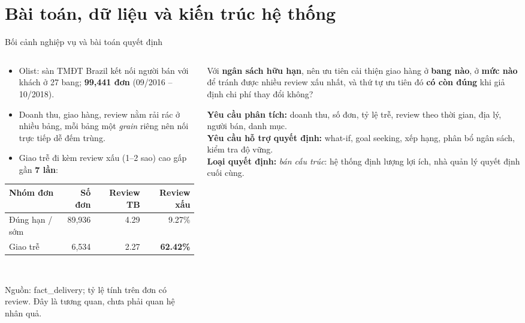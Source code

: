 \documentclass[aspectratio=169,10pt,xcolor=table]{beamer}
\newcommand{\presenter}{}
\newcommand{\setpresenter}[1]{\renewcommand{\presenter}{#1}}
\begin{document}
\setpresenter{Tạ Tiến Tài}
\section{Bài toán, dữ liệu và kiến trúc hệ thống}

\begin{frame}{Bối cảnh nghiệp vụ và bài toán quyết định}
  \begin{columns}[T]
    \begin{column}{0.5\textwidth}
      \small
      \begin{itemize}
        \item Olist: sàn TMĐT Brazil kết nối người bán với khách ở 27 bang; \textbf{99,441 đơn} (09/2016 -- 10/2018).
        \item Doanh thu, giao hàng, review nằm rải rác ở nhiều bảng, mỗi bảng một \emph{grain} riêng nên nối trực tiếp dễ đếm trùng.
        \item Giao trễ đi kèm review xấu (1--2 sao) cao gấp gần \textbf{7 lần}:
      \end{itemize}
      \vspace{0.1cm}
      \centering\footnotesize
      \begin{tabular}{@{}lrrr@{}}
        \toprule
        Nhóm đơn & Số đơn & Review TB & Review xấu\\
        \midrule
        Đúng hạn / sớm & 89,936 & 4.29 & \textcolor{good}{9.27\%}\\
        Giao trễ & 6,534 & 2.27 & \textcolor{bad}{\textbf{62.42\%}}\\
        \bottomrule
      \end{tabular}\\[0.1cm]
      {\tiny\color{muted}Nguồn: fact\_delivery; tỷ lệ tính trên đơn có review. Đây là tương quan, chưa phải quan hệ nhân quả.\par}
    \end{column}
    \begin{column}{0.47\textwidth}
      \begin{keybox}[title={Câu hỏi quyết định},coltitle=white,colbacktitle=bkblue,fonttitle=\small\bfseries]
        Với \textbf{ngân sách hữu hạn}, nên ưu tiên cải thiện giao hàng ở \textbf{bang nào}, ở \textbf{mức nào} để tránh được nhiều review xấu nhất, và thứ tự ưu tiên đó \textbf{có còn đúng} khi giả định chi phí thay đổi không?
      \end{keybox}
      \vspace{0.05cm}
      \footnotesize
      \textbf{Yêu cầu phân tích:} doanh thu, số đơn, tỷ lệ trễ, review theo thời gian, địa lý, người bán, danh mục.\\[0.1cm]
      \textbf{Yêu cầu hỗ trợ quyết định:} what-if, goal seeking, xếp hạng, phân bổ ngân sách, kiểm tra độ vững.\\[0.1cm]
      \textbf{Loại quyết định:} \emph{bán cấu trúc}: hệ thống định lượng lợi ích, nhà quản lý quyết định cuối cùng.
    \end{column}
  \end{columns}
\end{frame}
\end{document}
